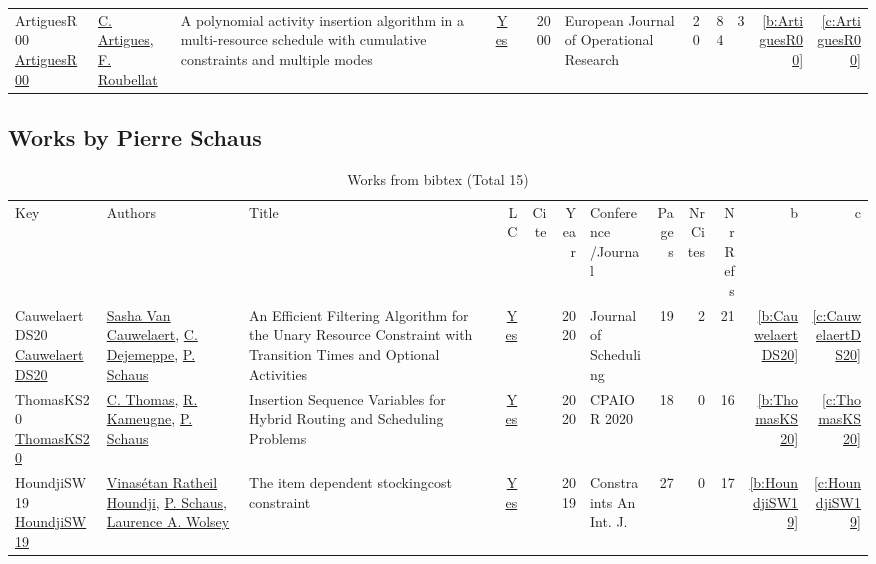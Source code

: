 {\begin{longtable}{>{\raggedright\arraybackslash}p{3cm}>{\raggedright\arraybackslash}p{6cm}>{\raggedright\arraybackslash}p{6.5cm}rrrp{2.5cm}rrrrr}
ArtiguesR00 \href{https://doi.org/10.1016/S0377-2217(99)00496-8}{ArtiguesR00} & \hyperref[auth:a6]{C. Artigues}, \hyperref[auth:a721]{F. Roubellat} & A polynomial activity insertion algorithm in a multi-resource schedule with cumulative constraints and multiple modes & \href{works/ArtiguesR00.pdf}{Yes} & \cite{ArtiguesR00} & 2000 & European Journal of Operational Research & 20 & 84 & 3 & \ref{b:ArtiguesR00} & \ref{c:ArtiguesR00}\\
\end{longtable}
}

\subsection{Works by Pierre Schaus}
\label{sec:a148}
{\scriptsize
\begin{longtable}{>{\raggedright\arraybackslash}p{3cm}>{\raggedright\arraybackslash}p{6cm}>{\raggedright\arraybackslash}p{6.5cm}rrrp{2.5cm}rrrrr}
\rowcolor{white}\caption{Works from bibtex (Total 15)}\\ \toprule
\rowcolor{white}Key & Authors & Title & LC & Cite & Year & \shortstack{Conference\\/Journal} & Pages & \shortstack{Nr\\Cites} & \shortstack{Nr\\Refs} & b & c \\ \midrule\endhead
\bottomrule
\endfoot
CauwelaertDS20 \href{http://dx.doi.org/10.1007/s10951-019-00632-8}{CauwelaertDS20} & \hyperref[auth:a848]{Sasha Van Cauwelaert}, \hyperref[auth:a208]{C. Dejemeppe}, \hyperref[auth:a148]{P. Schaus} & An Efficient Filtering Algorithm for the Unary Resource Constraint with Transition Times and Optional Activities & \href{works/CauwelaertDS20.pdf}{Yes} & \cite{CauwelaertDS20} & 2020 & Journal of Scheduling & 19 & 2 & 21 & \ref{b:CauwelaertDS20} & \ref{c:CauwelaertDS20}\\
ThomasKS20 \href{https://doi.org/10.1007/978-3-030-58942-4\_30}{ThomasKS20} & \hyperref[auth:a847]{C. Thomas}, \hyperref[auth:a10]{R. Kameugne}, \hyperref[auth:a148]{P. Schaus} & Insertion Sequence Variables for Hybrid Routing and Scheduling Problems & \href{works/ThomasKS20.pdf}{Yes} & \cite{ThomasKS20} & 2020 & CPAIOR 2020 & 18 & 0 & 16 & \ref{b:ThomasKS20} & \ref{c:ThomasKS20}\\
HoundjiSW19 \href{https://doi.org/10.1007/s10601-018-9300-y}{HoundjiSW19} & \hyperref[auth:a229]{Vinas{\'{e}}tan Ratheil Houndji}, \hyperref[auth:a148]{P. Schaus}, \hyperref[auth:a230]{Laurence A. Wolsey} & The item dependent stockingcost constraint & \href{works/HoundjiSW19.pdf}{Yes} & \cite{HoundjiSW19} & 2019 & Constraints An Int. J. & 27 & 0 & 17 & \ref{b:HoundjiSW19} & \ref{c:HoundjiSW19}\\

\end{longtable}}
